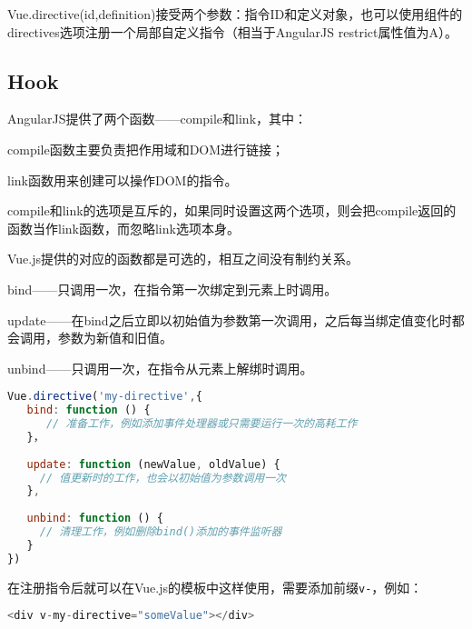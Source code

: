 Vue.directive(id,definition)接受两个参数：指令ID和定义对象，也可以使用组件的directives选项注册一个局部自定义指令（相当于AngularJS restrict属性值为A）。


\subsection{Hook}

AngularJS提供了两个函数——compile和link，其中：

\begin{compactitem}
\item compile函数主要负责把作用域和DOM进行链接；
\item link函数用来创建可以操作DOM的指令。
\end{compactitem}

compile和link的选项是互斥的，如果同时设置这两个选项，则会把compile返回的函数当作link函数，而忽略link选项本身。



Vue.js提供的对应的函数都是可选的，相互之间没有制约关系。

\begin{compactitem}
\item bind——只调用一次，在指令第一次绑定到元素上时调用。


\item update——在bind之后立即以初始值为参数第一次调用，之后每当绑定值变化时都会调用，参数为新值和旧值。


\item unbind——只调用一次，在指令从元素上解绑时调用。

\end{compactitem}



\begin{lstlisting}[language=JavaScript]
Vue.directive('my-directive',{
   bind: function () {
      // 准备工作，例如添加事件处理器或只需要运行一次的高耗工作
   }，
   
   update: function (newValue, oldValue) {
     // 值更新时的工作，也会以初始值为参数调用一次
   },
   
   unbind: function () {
     // 清理工作，例如删除bind()添加的事件监听器
   }
})
\end{lstlisting}


在注册指令后就可以在Vue.js的模板中这样使用，需要添加前缀\texttt{v-}，例如：


\begin{lstlisting}[language=JavaScript]
<div v-my-directive="someValue"></div>
\end{lstlisting}

